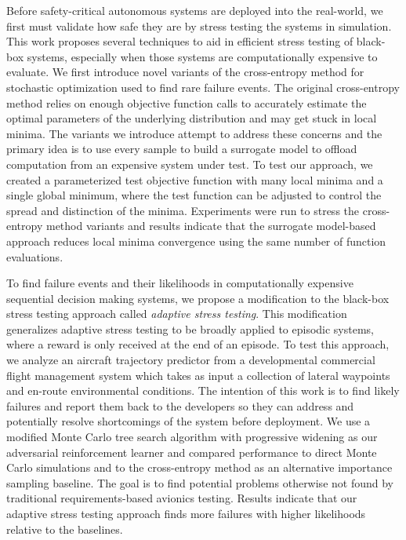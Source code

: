 Before safety-critical autonomous systems are deployed into the real-world, we first must validate how safe they are by stress testing the systems in simulation.
This work proposes several techniques to aid in efficient stress testing of black-box systems, especially when those systems are computationally expensive to evaluate.
We first introduce novel variants of the cross-entropy method for stochastic optimization used to find rare failure events.
The original cross-entropy method relies on enough objective function calls to accurately estimate the optimal parameters of the underlying distribution and may get stuck in local minima.
The variants we introduce attempt to address these concerns and the primary idea is to use every sample to build a surrogate model to offload computation from an expensive system under test.
To test our approach, we created a parameterized test objective function with many local minima and a single global minimum, where the test function can be adjusted to control the spread and distinction of the minima.
Experiments were run to stress the cross-entropy method variants and results indicate that the surrogate model-based approach reduces local minima convergence using the same number of function evaluations.

To find failure events and their likelihoods in computationally expensive sequential decision making systems, we propose a modification to the black-box stress testing approach called \textit{adaptive stress testing}.
This modification generalizes adaptive stress testing to be broadly applied to episodic systems, where a reward is only received at the end of an episode.
To test this approach, we analyze an aircraft trajectory predictor from a developmental commercial flight management system which takes as input a collection of lateral waypoints and en-route environmental conditions.
The intention of this work is to find likely failures and report them back to the developers so they can address and potentially resolve shortcomings of the system before deployment. 
We use a modified Monte Carlo tree search algorithm with progressive widening as our adversarial reinforcement learner and compared performance to direct Monte Carlo simulations and to the cross-entropy method as an alternative importance sampling baseline.
The goal is to find potential problems otherwise not found by traditional requirements-based avionics testing.
Results indicate that our adaptive stress testing approach finds more failures with higher likelihoods relative to the baselines.

